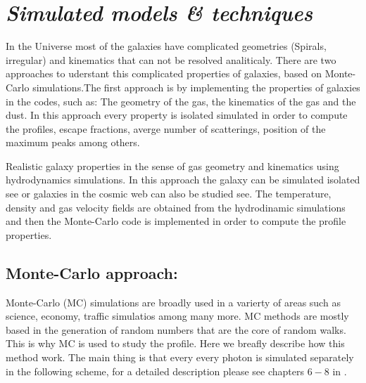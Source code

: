 \section{\emph{Simulated models \& techniques}}

In the Universe most of the galaxies have complicated
geometries (Spirals, irregular) and kinematics that 
can not be resolved analiticaly. There are two approaches
to uderstant this complicated properties of galaxies, based
on Monte-Carlo simulations.The first approach is by implementing 
the properties of galaxies in the codes, such as: The geometry
of the gas, the kinematics of the gas and the dust. In this 
approach every property is isolated simulated in order
to compute the \ly profiles, escape fractions, averge number
of scatterings, position of the maximum peaks among others. 

Realistic galaxy properties in the sense of gas geometry
and kinematics using hydrodynamics simulations. In this 
approach the galaxy can be simulated isolated see \citep{Verhamme12}
or galaxies in the cosmic web can also be studied see\citep{Yajima12}.
The temperature, density and gas velocity fields are obtained from 
the hydrodinamic simulations and then the Monte-Carlo code is 
implemented in order to compute the profile properties.

\subsection{Monte-Carlo approach:}

Monte-Carlo (MC) simulations are broadly used in a varierty of 
areas such as science, economy, traffic simulatios among 
many more. MC methods are mostly based in the
generation of random numbers that are the core of 
random walks. This is why MC is used to study the
\ly profile. Here we breafly describe how this method 
work. The main thing is that every every \ly photon is simulated
separately in the following scheme, for a detailed description 
please see chapters $6-8$ in \citep{LaursenPhD} .

